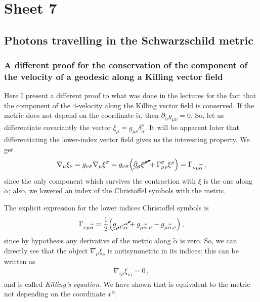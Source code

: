 \documentclass[main.tex]{subfiles}
\begin{document}
\section{Sheet 7}

\subsection{Photons travelling in the Schwarzschild metric}

\subsubsection{A different proof for the conservation of the component of the velocity of a geodesic along a Killing vector field}

Here I present a different proof to what was done in the lectures for the fact that the component of the 4-velocity along the Killing vector field is conserved. 
If the metric does not depend on the coordinate \(\widetilde{\alpha }\), then \(\partial_{\widetilde{\alpha }} g_{\mu \nu } = 0\). So, let us differentiate covariantly the vector \(\xi_{\mu } = g_{\mu \nu } \delta^{\nu}_{\widetilde{\alpha }}\).
It will be apparent later that differentiating the lower-index vector field gives us the interesting property.
We get 
%
\begin{align}
  \nabla_{\mu } \xi_{\nu } =
  g_{\nu \sigma } \nabla_{\mu } \xi^{\sigma }
  =  g_{\nu \sigma }
  \qty(\cancelto{}{\partial_{\mu } \xi^{\sigma }} + \Gamma^{\sigma }_{\mu \rho } \xi^{\rho })
  = \Gamma_{\nu \mu \widetilde{\alpha }}
\,,
\end{align}
%
since the only component which survives the contraction with \(\xi \) is the one along \(\widetilde{\alpha} \); also, we lowered an index of the Christoffel symbols with the metric. 

The explicit expression for the lower indices Christoffel symbols is 
%
\begin{align}
  \Gamma_{\nu \mu \widetilde{\alpha }}
  = \frac{1}{2} \qty(\cancelto{}{g_{\mu \nu , \widetilde{\alpha }}} +
  g_{\mu \widetilde{\alpha }, \nu }
  - g_{\mu \widetilde{\alpha }, \nu })
\,,
\end{align}
%
since by hypothesis any derivative of the metric along \(\widetilde{\alpha}\) is zero. So, we can directly see that the object \(\nabla_{\mu } \xi_{\nu }\) is antisymmetric in its indices: this can be written as 
%
\begin{align}
  \nabla_{(\mu } \xi_{\nu )} = 0
\,,
\end{align}
%
and is called \emph{Killing's equation}. We have shown that is equivalent to the metric not depending on the coordinate \(x^{\widetilde{\alpha}}\).
\end{document}
